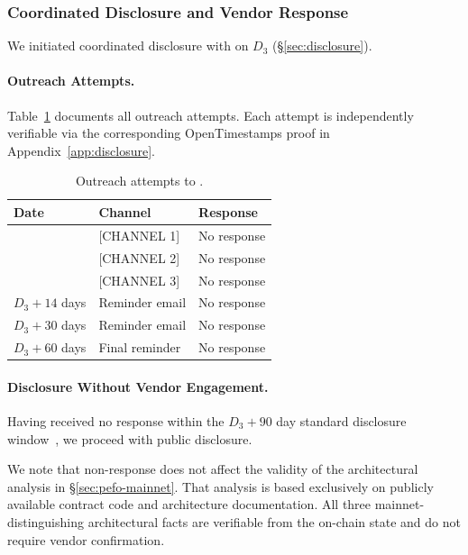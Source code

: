 
\subsubsection{Coordinated Disclosure and Vendor Response}
\label{sec:pefo-disclosure-2}

We initiated coordinated disclosure with \DEPLOYEDAPP{} on $D_3$
(\S\ref{sec:disclosure}).

\paragraph{Outreach Attempts.}
Table~\ref{tab:outreach-2} documents all outreach attempts. Each attempt is
independently verifiable via the corresponding OpenTimestamps proof in
Appendix~\ref{app:disclosure}.

\begin{table}[h]
\centering
\caption{Outreach attempts to \DEPLOYEDAPP{}.}
\label{tab:outreach-2}
\begin{tabular}{lll}
\toprule
Date & Channel & Response \\
\midrule
[DATE] & [CHANNEL 1] & No response \\
[DATE] & [CHANNEL 2] & No response \\
[DATE] & [CHANNEL 3] & No response \\
$D_3 + 14$ days & Reminder email & No response \\
$D_3 + 30$ days & Reminder email & No response \\
$D_3 + 60$ days & Final reminder & No response \\
\bottomrule
\end{tabular}
\end{table}

\paragraph{Disclosure Without Vendor Engagement.}
Having received no response within the $D_3 + 90$ day standard disclosure
window~\cite{google-project-zero}, we proceed with public disclosure.

We note that non-response does not affect the validity of the architectural
analysis in \S\ref{sec:pefo-mainnet}. That analysis is based exclusively
on publicly available contract code and architecture documentation. All three
mainnet-distinguishing architectural facts are verifiable from the on-chain
state and do not require vendor confirmation.


